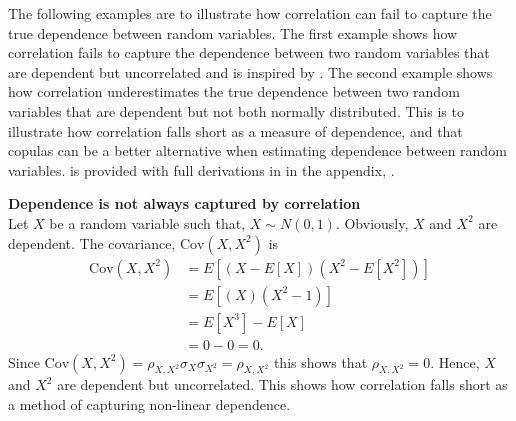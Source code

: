 The following examples are to illustrate how correlation can fail to capture the true dependence between random variables. The first example shows how correlation fails to capture the dependence between two random variables that are dependent but uncorrelated and is inspired by . The second example shows how correlation underestimates the true dependence between two random variables that are dependent but not both normally distributed. This is to illustrate how correlation falls short as a measure of dependence, and that copulas can be a better alternative when estimating dependence between random variables.  is provided with full derivations in  in the appendix, .

\begin{example}\label{ex:CorrelationFail}
    \textbf{Dependence is not always captured by correlation}\\
    Let $X$ be a random variable such that, $X \sim N(0,1)$. Obviously, $X$ and $X^2$ are dependent. The covariance, $\mathrm{Cov}(X,X^2)$ is 
    \begin{align*}
        \mathrm{Cov}(X,X^2) &= E \left[  (X-E\left[  X \right])(X^2-E\left[  X^2 \right])  \right]\\
         &=  E \left[  (X)(X^2-1)  \right]\\
         &= E \left[  X^3  \right] - E \left[  X  \right]\\
         &= 0-0 = 0 .
    \end{align*}
    Since $\mathrm{Cov}(X,X^2) = \rho_{X,X^2}\sigma_{X}\sigma_{X^2} = \rho_{X,X^2}$ this shows that $\rho_{X,X^2} = 0.$
    Hence, $X$ and $X^2$ are dependent but uncorrelated. This shows how correlation falls short as a method of capturing non-linear dependence.
    

    
\end{example}

